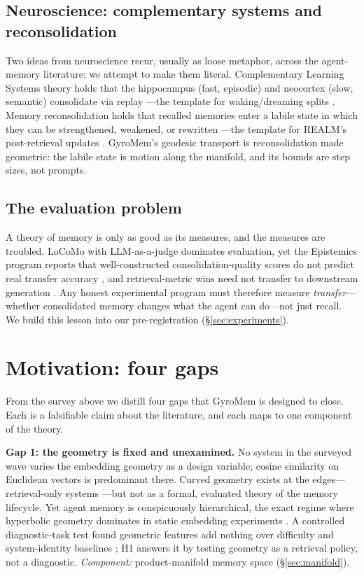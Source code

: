 \documentclass[11pt,a4paper]{article}
\begin{document}
\subsection{Neuroscience: complementary systems and reconsolidation}

Two ideas from neuroscience recur, usually as loose metaphor, across the
agent-memory literature; we attempt to make them literal. Complementary
Learning Systems theory holds that the hippocampus (fast, episodic) and
neocortex (slow, semantic) consolidate via replay \cite{mcclelland1995}---the
template for waking/dreaming splits \cite{engramrag}. Memory
reconsolidation holds that recalled memories enter a labile state in which
they can be strengthened, weakened, or rewritten \cite{nader2000}---the
template for REALM's post-retrieval updates \cite{realm}. GyroMem's
geodesic transport is reconsolidation made geometric: the labile state is
motion along the manifold, and its bounds are step sizes, not prompts.

\subsection{The evaluation problem}

A theory of memory is only as good as its measures, and the measures are
troubled. LoCoMo with LLM-as-a-judge dominates evaluation, yet the
Epistemics program reports that well-constructed consolidation-quality
scores do not predict real transfer accuracy \cite{epistemics}, and
retrieval-metric wins need not transfer to downstream generation
\cite{engramrag}. Any honest experimental program must therefore measure
\emph{transfer}---whether consolidated memory changes what the agent can
do---not just recall. We build this lesson into our pre-registration
(\S\ref{sec:experiments}).

\section{Motivation: four gaps}

From the survey above we distill four gaps that GyroMem is designed to
close. Each is a falsifiable claim about the literature, and each maps to
one component of the theory.

\textbf{Gap 1: the geometry is fixed and unexamined.} No system in the
surveyed wave varies the embedding geometry as a design variable; cosine similarity on Euclidean
vectors is predominant there. Curved geometry exists at the edges---retrieval-only
systems \cite{hyperbolicrag,chakrabarti2026}---but not as a formal, evaluated theory of the memory lifecycle. Yet agent memory is conspicuously hierarchical, the exact regime
where hyperbolic geometry dominates in static embedding experiments \cite{nickel2017}. A controlled diagnostic-task test found geometric features add nothing over difficulty and system-identity baselines \cite{geometry}; H1 answers it by testing geometry as a retrieval policy, not a diagnostic. \emph{Component:}
product-manifold memory space (\S\ref{sec:manifold}).
\end{document}
